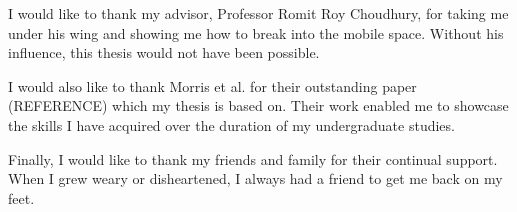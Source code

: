 I would like to thank my advisor, Professor Romit Roy Choudhury, for taking me under his wing and showing me how to break into the mobile space. Without his influence, this thesis would not have been possible.

I would also like to thank Morris et al. for their outstanding paper (REFERENCE) which my thesis is based on. Their work enabled me to showcase the skills I have acquired over the duration of my undergraduate studies.

Finally, I would like to thank my friends and family for their continual support. When I grew weary or disheartened, I always had a friend to get me back on my feet. 